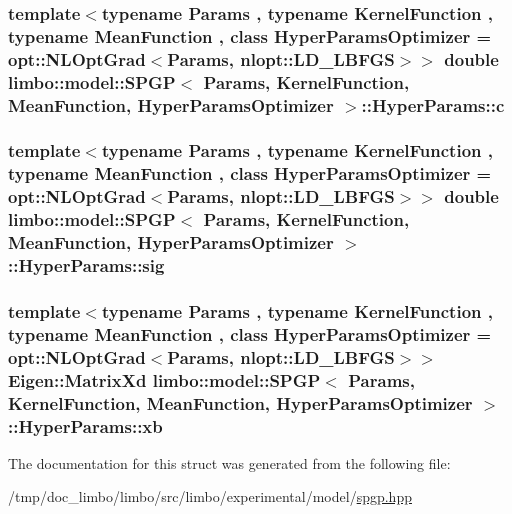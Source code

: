 \subsubsection[{c}]{\setlength{\rightskip}{0pt plus 5cm}template$<$typename Params , typename Kernel\+Function , typename Mean\+Function , class Hyper\+Params\+Optimizer  = opt\+::\+N\+L\+Opt\+Grad$<$\+Params, nlopt\+::\+L\+D\+\_\+\+L\+B\+F\+G\+S$>$$>$ double {\bf limbo\+::model\+::\+S\+P\+G\+P}$<$ Params, Kernel\+Function, Mean\+Function, Hyper\+Params\+Optimizer $>$\+::Hyper\+Params\+::c}\label{structlimbo_1_1model_1_1_s_p_g_p_1_1_hyper_params_ac7851b66eb3556f595b949ca241fef09}
\hypertarget{structlimbo_1_1model_1_1_s_p_g_p_1_1_hyper_params_aaefda5ae138a733a9435e9922582684c}{}
\subsubsection[{sig}]{\setlength{\rightskip}{0pt plus 5cm}template$<$typename Params , typename Kernel\+Function , typename Mean\+Function , class Hyper\+Params\+Optimizer  = opt\+::\+N\+L\+Opt\+Grad$<$\+Params, nlopt\+::\+L\+D\+\_\+\+L\+B\+F\+G\+S$>$$>$ double {\bf limbo\+::model\+::\+S\+P\+G\+P}$<$ Params, Kernel\+Function, Mean\+Function, Hyper\+Params\+Optimizer $>$\+::Hyper\+Params\+::sig}\label{structlimbo_1_1model_1_1_s_p_g_p_1_1_hyper_params_aaefda5ae138a733a9435e9922582684c}
\hypertarget{structlimbo_1_1model_1_1_s_p_g_p_1_1_hyper_params_a867369e27386e051b800653e759443b2}{}
\subsubsection[{xb}]{\setlength{\rightskip}{0pt plus 5cm}template$<$typename Params , typename Kernel\+Function , typename Mean\+Function , class Hyper\+Params\+Optimizer  = opt\+::\+N\+L\+Opt\+Grad$<$\+Params, nlopt\+::\+L\+D\+\_\+\+L\+B\+F\+G\+S$>$$>$ Eigen\+::\+Matrix\+Xd {\bf limbo\+::model\+::\+S\+P\+G\+P}$<$ Params, Kernel\+Function, Mean\+Function, Hyper\+Params\+Optimizer $>$\+::Hyper\+Params\+::xb}\label{structlimbo_1_1model_1_1_s_p_g_p_1_1_hyper_params_a867369e27386e051b800653e759443b2}


The documentation for this struct was generated from the following file\+:\begin{DoxyCompactItemize}
\item 
/tmp/doc\+\_\+limbo/limbo/src/limbo/experimental/model/\hyperlink{spgp_8hpp}{spgp.\+hpp}\end{DoxyCompactItemize}
